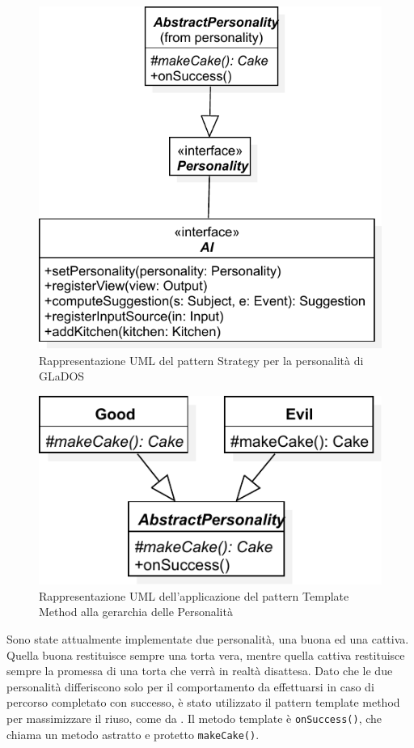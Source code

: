 \begin{figure}[h]
	\centering{}
	\includegraphics[width=\textwidth]{img/strategy}
	\caption{Rappresentazione UML del pattern Strategy per la personalità di GLaDOS}
	\label{img:strategy}
\end{figure}

\begin{figure}[h]
	\centering{}
	\includegraphics[width=\textwidth]{img/template}
	\caption{Rappresentazione UML dell'applicazione del pattern Template Method alla gerarchia delle Personalità}
	\label{img:template}
\end{figure}

Sono state attualmente implementate due personalità, una buona ed una cattiva.
Quella buona restituisce sempre una torta vera, mentre quella cattiva restituisce sempre la
promessa di una torta che verrà in realtà disattesa.
Dato che le due personalità differiscono solo per il comportamento da effettuarsi in caso di percorso completato con successo, è stato utilizzato il pattern template method per massimizzare il riuso, come da .
Il metodo template è \texttt{onSuccess()}, che chiama un metodo astratto e protetto
\texttt{makeCake()}.

